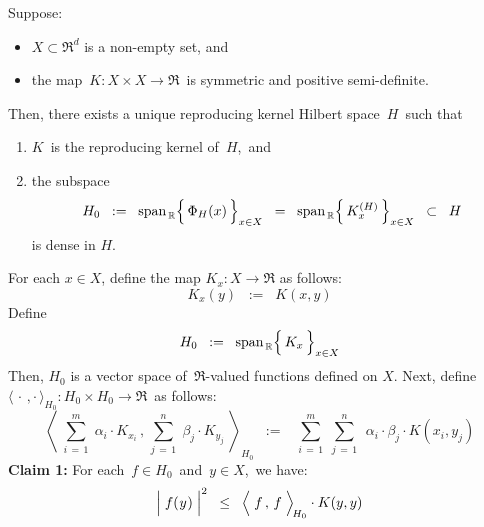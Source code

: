 \vskip 0.5cm
\begin{theorem}
\mbox{}
\vskip 0.1cm
\noindent
Suppose:
\begin{itemize}
\item
	$X \subset \Re^{d}$ is a non-empty set, and
\item
	the map \,$K : X \times X \longrightarrow \Re$\, is symmetric and positive semi-definite.
\end{itemize}
Then, there exists a unique reproducing kernel Hilbert space \,$H$\, such that
\begin{enumerate}
\item
	$K$\, is the reproducing kernel of \,$H$,\, and
\item
	the subspace
	\begin{equation*}
	H_{0}
	\;\; := \;\;
		\span_{\,\Re}\!\left\{\,\overset{{\color{white}.}}{\Phi_{H}(x)}\,\right\}_{x \in X}
	\;\; = \;\;
		\span_{\,\Re}\!\left\{\,K^{(H)}_{x}\,\right\}_{x \in X}
	\;\; \subset \;\;
		H
	\end{equation*}
	is dense in $H$.
\end{enumerate}
\end{theorem}
\proof
For each $x \in X$, define the map $K_{x} : X \longrightarrow \Re$ as follows:
\begin{equation*}
K_{x}(y) \;\; := \;\; K(x,y)
\end{equation*}
Define
\begin{equation*}
H_{0}
\;\; := \;\;
	\span_{\,\Re}\!\left\{\,\overset{{\color{white}.}}{K_{x}}\,\right\}_{x \in X}
\end{equation*}
Then, $H_{0}$ is a vector space of \,$\Re$-valued functions defined on $X$.
Next, define
\,$\langle\,\cdot\,,\cdot\,\rangle_{H_{0}} : H_{0} \times H_{0} \longrightarrow \Re$\,
as follows:
\begin{equation*}
\left\langle\;
	\overset{m}{\underset{i\,=\,1}{\sum}}\; \alpha_{i} \cdot K_{x_{i}}
	\,,\,
	\overset{n}{\underset{j\,=\,1}{\sum}}\; \beta_{j} \cdot K_{y_{j}}
	\;\right\rangle_{\!\!H_{0}}
\;\; := \;\;\;
	\overset{m}{\underset{i\,=\,1}{\sum}}\;
	\overset{n}{\underset{j\,=\,1}{\sum}}\;\,
	\alpha_{i} \cdot \beta_{j} \cdot K(x_{i},y_{j})
\end{equation*}
\vskip 0.3cm
\noindent
\textbf{Claim 1:}\quad
For each \,$f \in H_{0}$\, and \,$y \in X$,\, we have:
\begin{equation*}
\left\vert\;f(\overset{{\color{white}-}}{y})\;\right\vert^{2}
\;\; \leq \;\;
	\left\langle\; \overset{{\color{white}.}}{f} \,,\, f \;\right\rangle_{\!H_{0}}
	\cdot
	K(y,y)
\end{equation*}
